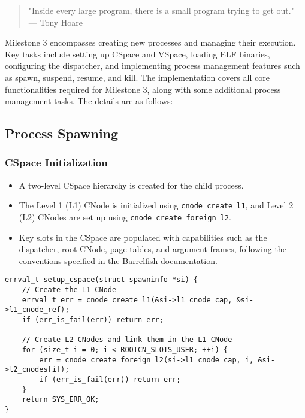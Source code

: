 \begin{quote}
"Inside every large program, there is a small program trying to get out." \\
\hspace*{\fill} — Tony Hoare
\end{quote}


Milestone 3 encompasses creating new processes and managing their execution. Key tasks include setting up CSpace and VSpace, loading ELF binaries, configuring the dispatcher, and implementing process management features such as spawn, suspend, resume, and kill.
The implementation covers all core functionalities required for Milestone 3, along with some additional process management tasks. The details are as follows:
\subsection*{Process Spawning}
\subsubsection*{CSpace Initialization}
\begin{itemize}
    \item A two-level CSpace hierarchy is created for the child process. 
    \item The Level 1 (L1) CNode is initialized using \texttt{cnode\_create\_l1}, and Level 2 (L2) CNodes are set up using \texttt{cnode\_create\_foreign\_l2}.
    \item  Key slots in the CSpace are populated with capabilities such as the dispatcher, root CNode, page tables, and argument frames, following the conventions specified in the Barrelfish documentation.
\end{itemize}

\begin{lstlisting}[caption={CSpace creation with L1 and L2 CNodes}, label=lst:cspace_creation]
errval_t setup_cspace(struct spawninfo *si) {
    // Create the L1 CNode
    errval_t err = cnode_create_l1(&si->l1_cnode_cap, &si->l1_cnode_ref);
    if (err_is_fail(err)) return err;

    // Create L2 CNodes and link them in the L1 CNode
    for (size_t i = 0; i < ROOTCN_SLOTS_USER; ++i) {
        err = cnode_create_foreign_l2(si->l1_cnode_cap, i, &si->l2_cnodes[i]);
        if (err_is_fail(err)) return err;
    }
    return SYS_ERR_OK;
}
\end{lstlisting}


